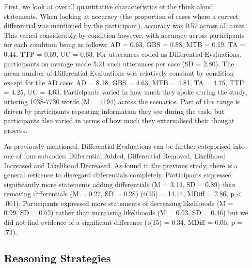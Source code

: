 \documentclass[a4paper, nobind]{templates/ociamthesis}
\begin{document}
First, we look at overall quantitative characteristics of the think aloud statements. When looking at accuracy (the proportion of cases where a correct differential was mentioned by the participant), accuracy was 0.57 across all cases. This varied considerably by condition however, with accuracy across participants for each condition being as follows: AD = 0.63, GBS = 0.88, MTB = 0.19, TA = 0.44, TTP = 0.69, UC = 0.63. For utterances coded as Differential Evaluations, participants on average made 5.21 such utterances per case (SD = 2.80). The mean number of Differential Evaluations was relatively constant by condition except for the AD case: AD = 8.18, GBS = 4.63, MTB = 4.81, TA = 4.75, TTP = 4.25, UC = 4.63. Participants varied in how much they spoke during the study, uttering 1038-7730 words (M = 4194) across the scenarios. Part of this range is driven by participants repeating information they see during the task, but participants also varied in terms of how much they externalised their thought process.

As previously mentioned, Differential Evaluations can be further categorised into one of four subcodes: Differential Added, Differential Removed, Likelihood Increased and Likelihood Decreased. As found in the previous study, there is a general reticence to disregard differentials completely. Participants expressed significantly more statements adding differentials (M = 3.14, SD = 0.89) than removing differentials (M = 0.27, SD = 0.28) (t(15) = 14.14, MDiff = 2.86, p \textless{} .001). Participants expressed more statements of decreasing likelihoods (M = 0.99, SD = 0.62) rather than increasing likelihoods (M = 0.93, SD = 0.46) but we did not find evidence of a significant difference (t(15) = 0.34, MDiff = 0.06, p = .73).

\hypertarget{reasoning-strategies}{%
\subsection*{Reasoning Strategies}\label{reasoning-strategies}}
\end{document}
